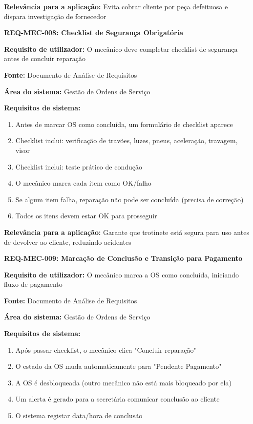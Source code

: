 \documentclass[11pt,a4paper]{article}
\newcommand{\reqheader}[1]{{\noindent\large\bfseries\color{sectionblue}#1}\par\vspace{0.3cm}}
\newcommand{\reqfield}[2]{{\noindent\textbf{#1:} #2}\par\vspace{0.2cm}}
\begin{document}
\reqfield{Relevância para a aplicação}{Evita cobrar cliente por peça defeituosa e dispara investigação de fornecedor}

\vspace{0.8cm}

\reqheader{REQ-MEC-008: Checklist de Segurança Obrigatória}

\reqfield{Requisito de utilizador}{O mecânico deve completar checklist de segurança antes de concluir reparação}

\reqfield{Fonte}{Documento de Análise de Requisitos}

\reqfield{Área do sistema}{Gestão de Ordens de Serviço}

\reqfield{Requisitos de sistema}{
	\begin{enumerate}
		\item Antes de marcar OS como concluída, um formulário de checklist aparece
		\item Checklist inclui: verificação de travões, luzes, pneus, aceleração, travagem, visor
		\item Checklist inclui: teste prático de condução
		\item O mecânico marca cada item como OK/falho
		\item Se algum item falha, reparação não pode ser concluída (precisa de correção)
		\item Todos os itens devem estar OK para prosseguir
	\end{enumerate}
}

\reqfield{Relevância para a aplicação}{Garante que trotinete está segura para uso antes de devolver ao cliente, reduzindo acidentes}

\vspace{0.8cm}

\reqheader{REQ-MEC-009: Marcação de Conclusão e Transição para Pagamento}

\reqfield{Requisito de utilizador}{O mecânico marca a OS como concluída, iniciando fluxo de pagamento}

\reqfield{Fonte}{Documento de Análise de Requisitos}

\reqfield{Área do sistema}{Gestão de Ordens de Serviço}

\reqfield{Requisitos de sistema}{
	\begin{enumerate}
		\item Após passar checklist, o mecânico clica "Concluir reparação"
		\item O estado da OS muda automaticamente para "Pendente Pagamento"
		\item A OS é desbloqueada (outro mecânico não está mais bloqueado por ela)
		\item Um alerta é gerado para a secretária comunicar conclusão ao cliente
		\item O sistema registar data/hora de conclusão
	\end{enumerate}
}
\end{document}

